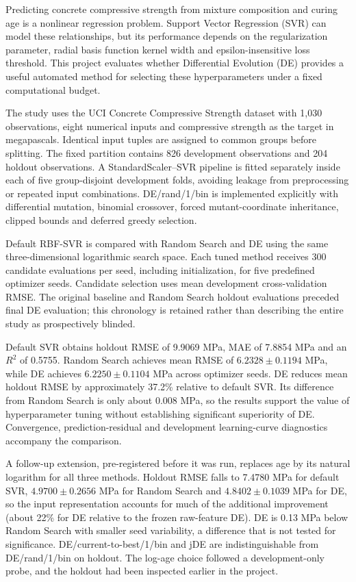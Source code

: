Predicting concrete compressive strength from mixture composition and curing age is a nonlinear regression problem. Support Vector Regression (SVR) can model these relationships, but its performance depends on the regularization parameter, radial basis function kernel width and epsilon-insensitive loss threshold. This project evaluates whether Differential Evolution (DE) provides a useful automated method for selecting these hyperparameters under a fixed computational budget.

The study uses the UCI Concrete Compressive Strength dataset with 1,030 observations, eight numerical inputs and compressive strength as the target in megapascals. Identical input tuples are assigned to common groups before splitting. The fixed partition contains 826 development observations and 204 holdout observations. A StandardScaler--SVR pipeline is fitted separately inside each of five group-disjoint development folds, avoiding leakage from preprocessing or repeated input combinations. DE/rand/1/bin is implemented explicitly with differential mutation, binomial crossover, forced mutant-coordinate inheritance, clipped bounds and deferred greedy selection.

Default RBF-SVR is compared with Random Search and DE using the same three-dimensional logarithmic search space. Each tuned method receives 300 candidate evaluations per seed, including initialization, for five predefined optimizer seeds. Candidate selection uses mean development cross-validation RMSE. The original baseline and Random Search holdout evaluations preceded final DE evaluation; this chronology is retained rather than describing the entire study as prospectively blinded.

Default SVR obtains holdout RMSE of 9.9069 MPa, MAE of 7.8854 MPa and an $R^2$ of 0.5755. Random Search achieves mean RMSE of $6.2328\pm0.1194$ MPa, while DE achieves $6.2250\pm0.1104$ MPa across optimizer seeds. DE reduces mean holdout RMSE by approximately 37.2\% relative to default SVR. Its difference from Random Search is only about 0.008 MPa, so the results support the value of hyperparameter tuning without establishing significant superiority of DE. Convergence, prediction-residual and development learning-curve diagnostics accompany the comparison.

A follow-up extension, pre-registered before it was run, replaces age by its natural logarithm for all three methods. Holdout RMSE falls to 7.4780 MPa for default SVR, $4.9700\pm0.2656$ MPa for Random Search and $4.8402\pm0.1039$ MPa for DE, so the input representation accounts for much of the additional improvement (about 22\% for DE relative to the frozen raw-feature DE). DE is 0.13 MPa below Random Search with smaller seed variability, a difference that is not tested for significance. DE/current-to-best/1/bin and jDE are indistinguishable from DE/rand/1/bin on holdout. The log-age choice followed a development-only probe, and the holdout had been inspected earlier in the project.

